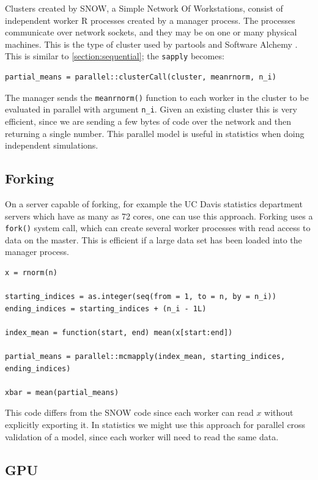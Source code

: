\documentclass[12pt]{article}
\begin{document}
Clusters created by SNOW, a Simple Network Of Workstations,
consist of independent worker R processes created by a manager process. The
processes communicate over network sockets, and they may be on one or many
physical machines.  This is the type of cluster used by partools and
Software Alchemy \cite{R-partools} \cite{matloff2014software}.  This is
similar to \ref{section:sequential}; the \texttt{sapply}
becomes:

\begin{verbatim}
partial_means = parallel::clusterCall(cluster, meanrnorm, n_i)
\end{verbatim}

The manager sends the \texttt{meanrnorm()} function to each worker in the
cluster to be evaluated in parallel with argument \texttt{n\_i}.  Given an
existing cluster this is very efficient, since we are sending a few bytes
of code over the network and then returning a single number. This parallel model is
useful in statistics when doing independent simulations.

\subsection{Forking}

On a server capable of forking, for example the UC Davis statistics
department servers which have as many as 72 cores, one can use this
approach. Forking uses a \texttt{fork()} system call, which can create
several worker processes with read access to data on the master. This is
efficient if a large data set has been loaded into the manager process.

\begin{verbatim}
x = rnorm(n)

starting_indices = as.integer(seq(from = 1, to = n, by = n_i))
ending_indices = starting_indices + (n_i - 1L)

index_mean = function(start, end) mean(x[start:end])

partial_means = parallel::mcmapply(index_mean, starting_indices, ending_indices)

xbar = mean(partial_means)
\end{verbatim}

This code differs from the SNOW code since each worker can read $x$ without
explicitly exporting it. In statistics we might use this approach for
parallel cross validation of a model, since each worker will need to read
the same data.

\subsection{GPU}
\end{document}

